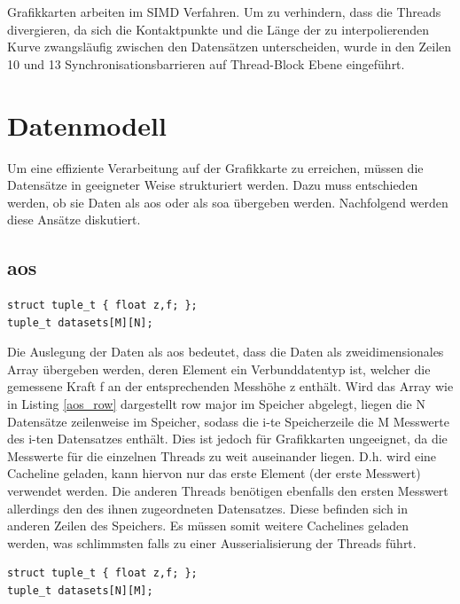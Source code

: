 Grafikkarten arbeiten im SIMD Verfahren. Um zu verhindern, dass die Threads divergieren, da sich die Kontaktpunkte und die Länge der zu interpolierenden Kurve zwangsläufig zwischen den Datensätzen unterscheiden, wurde in den Zeilen 10 und 13 Synchronisationsbarrieren auf Thread-Block Ebene eingeführt.

\section{Datenmodell}
Um eine effiziente Verarbeitung auf der Grafikkarte zu erreichen, müssen die Datensätze in geeigneter Weise strukturiert werden.
Dazu muss entschieden werden, ob sie Daten als \gls{aos} oder als \gls{soa} übergeben werden. Nachfolgend werden diese Ansätze diskutiert.

\subsection{\acrlong{aos}}
\begin{lstlisting}[label=aos_row,caption=Datenlayout \gls{aos} row major]
struct tuple_t { float z,f; };
tuple_t datasets[M][N];
\end{lstlisting}


Die Auslegung der Daten als \gls{aos} bedeutet, dass die Daten als zweidimensionales Array übergeben werden, deren Element ein Verbunddatentyp ist, welcher die gemessene Kraft f an der entsprechenden Messhöhe z enthält. Wird das Array wie in Listing \ref{aos_row} dargestellt row major im Speicher abgelegt, liegen die N Datensätze zeilenweise im Speicher, sodass die i-te Speicherzeile die M Messwerte des i-ten Datensatzes enthält.
Dies ist jedoch für Grafikkarten ungeeignet, da die Messwerte für die einzelnen Threads zu weit auseinander liegen. D.h. wird eine Cacheline geladen, kann hiervon nur das erste Element (der erste Messwert) verwendet werden. Die anderen Threads benötigen ebenfalls den ersten Messwert allerdings den des ihnen zugeordneten Datensatzes. Diese befinden sich in anderen Zeilen des Speichers.
Es müssen somit weitere Cachelines geladen werden, was schlimmsten falls zu einer Ausserialisierung der Threads führt.


\begin{lstlisting}[label=aos_col,caption=Datenlayout \gls{aos} column major]
struct tuple_t { float z,f; };
tuple_t datasets[N][M];
\end{lstlisting}

